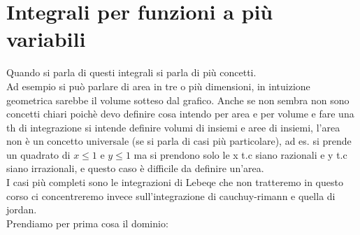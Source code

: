 \documentclass[a4paper, oneside]{article}
\begin{document}
\section{Integrali per funzioni a più variabili}
Quando si parla di questi integrali si parla di più concetti.\\
Ad esempio si può parlare di area in tre o più dimensioni, in intuizione geometrica sarebbe il volume sotteso dal grafico. Anche se non sembra non sono concetti chiari poichè devo definire cosa intendo per area e per volume e fare una th di integrazione si intende definire volumi di insiemi e aree di insiemi, l'area non è un concetto universale (se si parla di casi più particolare), ad es. si prende un quadrato di $x \leq 1$ e $y\leq 1$ ma si prendono solo le x t.c siano razionali e y t.c siano irrazionali, e questo caso è difficile da definire un'area.\\
I casi più  completi sono le integrazioni di Lebeqe che non tratteremo in questo corso ci concentreremo invece sull'integrazione di cauchuy-rimann e quella di jordan.\\
Prendiamo per prima cosa il dominio:
\tiny
\end{document}
